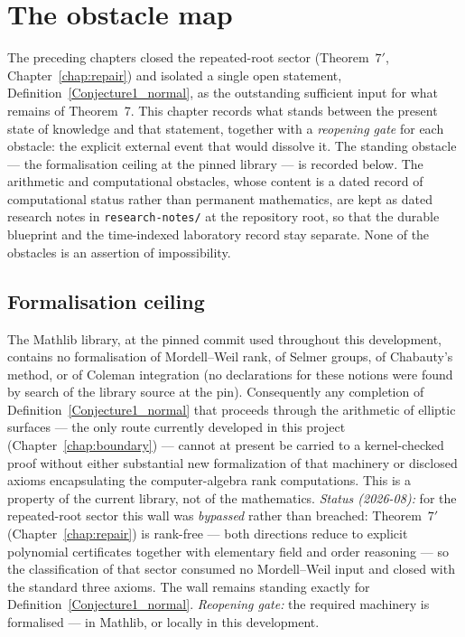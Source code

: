 \chapter{The obstacle map}\label{chap:obstacles}

The preceding chapters closed the repeated-root sector (Theorem~$7'$, Chapter~\ref{chap:repair}) and isolated a single open statement, Definition~\ref{Conjecture1_normal}, as the outstanding sufficient input for what remains of Theorem~7.  This chapter records
what stands between the present state of knowledge and that statement, together
with a \emph{reopening gate} for each obstacle: the explicit external event that
would dissolve it.  The standing obstacle --- the formalisation ceiling at the pinned library --- is
recorded below.  The arithmetic and computational obstacles, whose content is a
dated record of computational status rather than permanent mathematics, are kept
as dated research notes in \texttt{research-notes/} at the repository root, so
that the durable blueprint and the time-indexed laboratory record stay separate.
None of the obstacles is an assertion of impossibility.

\section{Formalisation ceiling}

\begin{remark}\label{wall-mathlib}
The Mathlib library, at the pinned commit used throughout this development,
contains no formalisation of Mordell--Weil rank, of Selmer groups, of Chabauty's
method, or of Coleman integration (no declarations for these notions were found by
search of the library source at the pin).  Consequently any completion of
Definition~\ref{Conjecture1_normal} that proceeds through the arithmetic of
elliptic surfaces --- the only route currently developed in this project (Chapter~\ref{chap:boundary}) --- cannot
at present be carried to a kernel-checked proof without either substantial new
formalization of that machinery or disclosed axioms encapsulating the
computer-algebra rank computations.  This is a property of the
current library, not of the mathematics.
\emph{Status (2026-08):} for the repeated-root sector this wall was \emph{bypassed} rather than breached: Theorem~$7'$ (Chapter~\ref{chap:repair}) is rank-free --- both directions reduce to explicit polynomial certificates together with elementary field and order reasoning --- so the classification of that sector consumed no Mordell--Weil input and closed with the standard three axioms. The wall remains standing exactly for Definition~\ref{Conjecture1_normal}.
\emph{Reopening gate:} the required machinery is formalised --- in Mathlib, or locally in this development.
\end{remark}

